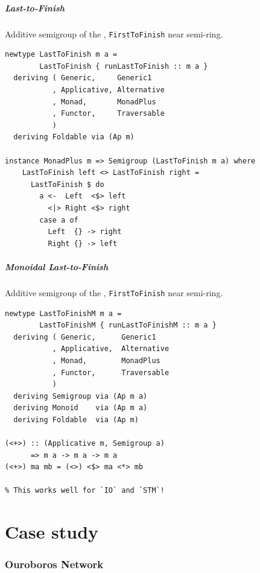\documentclass[t,dvipsnames,hyperref={colorlinks,citecolor=NavyBlue,linkcolor=NavyBlue,anchorcolor=NavyBlue,urlcolor=NavyBlue}]{beamer}
\begin{document}
\begin{frame}[fragile]
  \frametitle{Last-to-Finish}
  Additive semigroup of the , \texttt{FirstToFinish} near semi-ring.
  \begin{verbatim}
newtype LastToFinish m a =
        LastToFinish { runLastToFinish :: m a }
  deriving ( Generic,     Generic1
           , Applicative, Alternative
           , Monad,       MonadPlus
           , Functor,     Traversable
           )
  deriving Foldable via (Ap m)

instance MonadPlus m => Semigroup (LastToFinish m a) where
    LastToFinish left <> LastToFinish right =
      LastToFinish $ do
        a <-  Left  <$> left
          <|> Right <$> right
        case a of
          Left  {} -> right
          Right {} -> left
  \end{verbatim}

\end{frame}

\begin{frame}[fragile]
  \frametitle{Monoidal Last-to-Finish}
  Additive semigroup of the , \texttt{FirstToFinish} near semi-ring.
  \begin{verbatim}
newtype LastToFinishM m a =
        LastToFinishM { runLastToFinishM :: m a }
  deriving ( Generic,      Generic1
           , Applicative,  Alternative
           , Monad,        MonadPlus
           , Functor,      Traversable
           )
  deriving Semigroup via (Ap m a)
  deriving Monoid    via (Ap m a)
  deriving Foldable  via (Ap m)

(<+>) :: (Applicative m, Semigroup a)
      => m a -> m a -> m a
(<+>) ma mb = (<>) <$> ma <*> mb

% This works well for `IO` and `STM`!
  \end{verbatim}


\end{frame}

\part{Case study}
\frame{
  \partpage
  \tableofcontents[part=2]
}

\section{Ouroboros Network}
\end{document}

